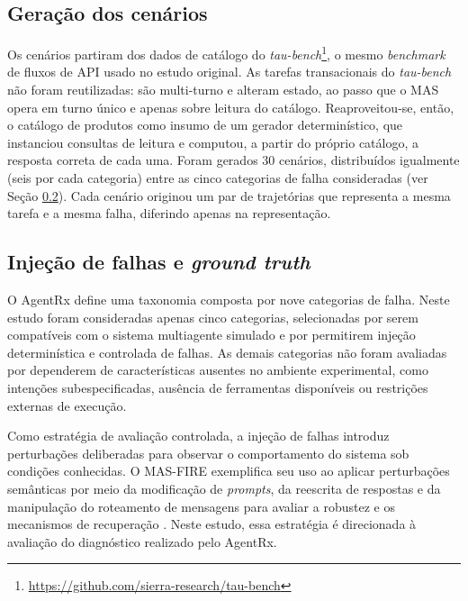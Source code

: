 \documentclass[sigconf]{acmart}
\begin{document}
\subsection{Geração dos cenários}

Os cenários partiram dos dados de catálogo do
\textit{tau-bench}\footnote{\url{https://github.com/sierra-research/tau-bench}}, o mesmo \textit{benchmark} de fluxos
de API usado no estudo original. As tarefas transacionais do \textit{tau-bench} não foram reutilizadas: são multi-turno
e alteram estado, ao passo que o MAS opera em turno único e apenas sobre leitura do catálogo. Reaproveitou-se, então, o
catálogo de produtos como insumo de um gerador determinístico, que instanciou consultas de leitura e computou, a partir
do próprio catálogo, a resposta correta de cada uma. Foram gerados 30 cenários, distribuídos igualmente (seis por cada
categoria) entre as cinco categorias de falha consideradas (ver Seção \ref{subsec:injecao-falhas-e-ground-truth}). Cada
cenário originou um par de trajetórias que representa a mesma tarefa e a mesma falha, diferindo apenas na
representação.

\subsection{Injeção de falhas e \textit{ground truth}}
\label{subsec:injecao-falhas-e-ground-truth}

O AgentRx define uma taxonomia composta por nove categorias de falha. Neste estudo foram consideradas apenas cinco
categorias, selecionadas por serem compatíveis com o sistema multiagente simulado e por permitirem injeção
determinística e controlada de falhas. As demais categorias não foram avaliadas por dependerem de características
ausentes no ambiente experimental, como intenções subespecificadas, ausência de ferramentas disponíveis ou restrições
externas de execução.

Como estratégia de avaliação controlada, a injeção de falhas introduz perturbações deliberadas para observar o
comportamento do sistema sob condições conhecidas. O MAS-FIRE exemplifica seu uso ao aplicar perturbações semânticas
por meio da modificação de \textit{prompts}, da reescrita de respostas e da manipulação do roteamento de mensagens para
avaliar a robustez e os mecanismos de recuperação \cite{jia2026mas}. Neste estudo, essa estratégia é direcionada à
avaliação do diagnóstico realizado pelo AgentRx.
\end{document}
